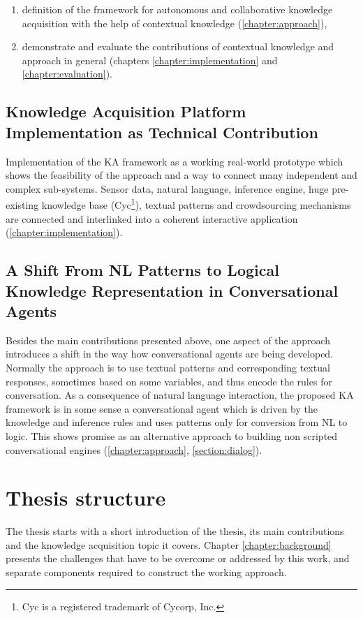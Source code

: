 \begin{enumerate}
\item definition of the framework for autonomous and collaborative knowledge 
acquisition with the help of contextual knowledge (\autoref{chapter:approach}), 
\item demonstrate and evaluate the contributions of contextual knowledge and 
approach in general (chapters \ref{chapter:implementation} and 
\ref{chapter:evaluation}).
\end{enumerate}

\subsection{Knowledge Acquisition Platform Implementation as Technical 
Contribution }
Implementation of the KA framework as a working real-world prototype which 
shows the feasibility of the approach and a way to connect many independent and 
complex sub-systems. Sensor data, natural language, inference engine, 
huge pre-existing knowledge base (Cyc\footnote{Cyc is a registered trademark 
of Cycorp, Inc.})\parencite{Lenat1995}, textual patterns 
and crowdsourcing mechanisms are connected and interlinked into a coherent 
interactive application (\autoref{chapter:implementation}).

\subsection{A Shift From NL Patterns to Logical Knowledge Representation in 
Conversational Agents}
Besides the main contributions presented above, one aspect of the approach 
introduces a shift in the way how conversational agents are being developed. 
Normally the approach is to use textual patterns and corresponding textual 
responses, sometimes based on some variables, and thus encode the rules for 
conversation. As a consequence of natural language interaction, the proposed 
KA framework is in some sense a conversational agent which is driven by the 
knowledge and inference rules and uses patterns only for conversion from 
NL to logic. This shows promise as an alternative approach to building non 
scripted conversational engines (\autoref{chapter:approach}, 
\autoref{section:dialog}).

\section{Thesis structure}
The thesis starts with a short introduction of the thesis, its main 
contributions and the knowledge acquisition topic it covers. 
Chapter \ref{chapter:background} presents the challenges that have to be overcome
or addressed by this work, and separate components required to construct the 
working approach.

